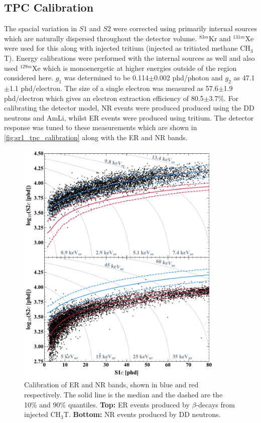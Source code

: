 \subsection{TPC Calibration}
\par
The spacial variation in $S1$ and $S2$ were corrected using primarily internal sources which are naturally dispersed throughout the detector volume.
${}^{83m}$Kr and ${}^{131m}$Xe were used for this along with injected tritium (injected as tritiated methane CH$_3$T).
Energy calibrations were performed with the internal sources as well and also used ${}^{129m}$Xe which is monoenergetic at higher energies outside of the region considered here.
$g_1$ was determined to be 0.114$\pm$0.002 phd/photon and $g_2$ as 47.1$\pm$1.1 phd/electron.
The size of a single electron was measured as 57.6$\pm$1.9 phd/electron which gives an electron extraction efficiency of 80.5$\pm$3.7\%.
For calibrating the detector model, NR events were produced produced using the DD neutrons and AmLi, whilst ER events were produced using tritium.
The detector response was tuned to these measurements which are shown in \autoref{fig:sr1_tpc_calibration} along with the ER and NR bands.
\begin{figure}
    \centering
    \includegraphics[width=10cm]{Figures/EFT/All_SR1_Plots/SR1WS_calOnly_0629_twoPanel.pdf}
    \caption{Calibration of ER and NR bands, shown in blue and red respectively.
             The solid line is the median and the dashed are the 10\% and 90\% quantiles.
             \textbf{Top:} ER events produced by $\beta$-decays from injected CH$_3$T.
             \textbf{Bottom:} NR events produced by DD neutrons.
             }
    \label{fig:sr1_tpc_calibration}
\end{figure}


